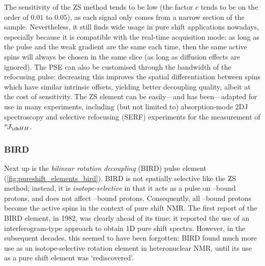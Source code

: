 The sensitivity of the ZS method tends to be low (the factor $c$ tends to be on the order of $0.01$ to $0.05$), as each signal only comes from a narrow section of the sample.
Nevertheless, it still finds wide usage in pure shift applications nowadays, especially because it is compatible with the real-time acquisition mode\autocite{Meyer2013ACIE}: as long as the pulse and the weak gradient are the same each time, then the same active spins will always be chosen in the same slice (as long as diffusion effects are ignored).
The PSE can also be customised through the bandwidth of the refocusing pulse: decreasing this improves the spatial differentiation between spins which have similar intrinsic offsets, yielding better decoupling quality, albeit at the cost of sensitivity.
The ZS element can be easily---and has been---adapted for use in many experiments, including (but not limited to) absorption-mode 2DJ spectroscopy\autocite{Pell2007JMR} and selective refocusing (SERF) experiments for the measurement of $\nJ{HH}$\autocite{Giraud2010ACIE,Gubensak2014CC,Mishra2017JMR,Buchberger2018MRC}.


\subsubsection{BIRD}

Next up is the \textit{bilinear rotation decoupling} (BIRD) pulse element (\cref{fig:pureshift_elements_bird}).
BIRD is not spatially selective like the ZS method; instead, it is \textit{isotope-selective} in that it acts as a  pulse on \carbon{}--bound protons, and does not affect \carbont{}--bound protons.
Consequently, all \carbon{}--bound protons become the active spins in the context of pure shift NMR.
The first report of the BIRD element\autocite{Garbow1982CPL}, in 1982, was clearly ahead of its time: it reported the use of an interferogram-type approach to obtain 1D pure shift spectra.
However, in the subsequent decades, this seemed to have been forgotten: BIRD found much more use as an isotope-selective rotation element in heteronuclear NMR\autocite{Uhrin1993JMRSA}, until its use as a pure shift element was `rediscovered'\autocite{Sakhaii2009JMR,Aguilar2011ACIE}.

